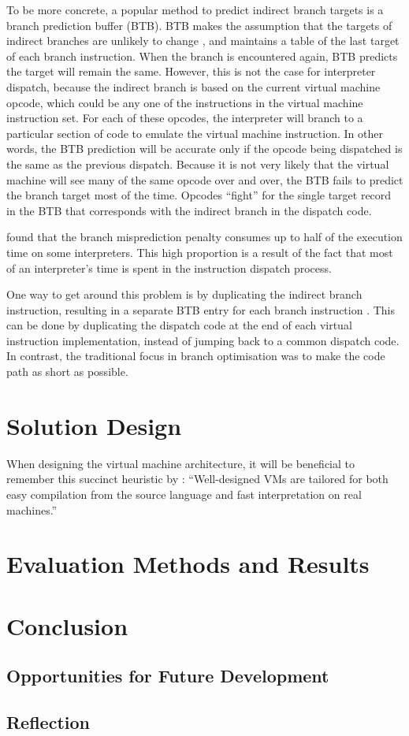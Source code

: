 		To be more concrete, a popular method to predict indirect branch targets is a branch prediction buffer (BTB). BTB makes the assumption that the targets of indirect branches are unlikely to change \citep{yeti}, and maintains a table of the last target of each branch instruction. When the branch is encountered again, BTB predicts the target will remain the same. However, this is not the case for interpreter dispatch, because the indirect branch is based on the current virtual machine opcode, which could be any one of the instructions in the virtual machine instruction set. For each of these opcodes, the interpreter will branch to a particular section of code to emulate the virtual machine instruction. In other words, the BTB prediction will be accurate only if the opcode being dispatched is the same as the previous dispatch. Because it is not very likely that the virtual machine will see many of the same opcode over and over, the BTB fails to predict the branch target most of the time. Opcodes ``fight'' for the single target record in the BTB that corresponds with the indirect branch in the dispatch code.
		
		\cite{structureinterpreters} found that the branch misprediction penalty consumes up to half of the execution time on some interpreters. This high proportion is a result of the fact that most of an interpreter's time is spent in the instruction dispatch process.
		
		One way to get around this problem is by duplicating the indirect branch instruction, resulting in a separate BTB entry for each branch instruction \citep{fastjava}. This can be done by duplicating the dispatch code at the end of each virtual instruction implementation, instead of jumping back to a common dispatch code. In contrast, the traditional focus in branch optimisation was to make the code path as short as possible.
		
\chapter{Solution Design}
	When designing the virtual machine architecture, it will be beneficial to remember this succinct heuristic by \cite{structureinterpreters}: ``Well-designed VMs are tailored for both easy compilation from the source language and fast interpretation on real machines.''

\chapter{Evaluation Methods and Results}

\chapter{Conclusion}
	
	\section{Opportunities for Future Development}
	
	\section{Reflection}

\bibliographysection

